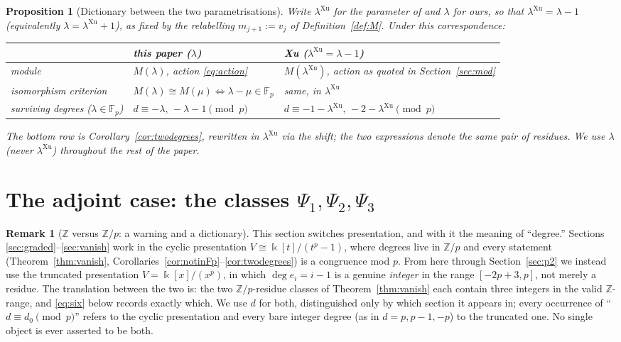 \documentclass[11pt,reqno]{amsart}
\theoremstyle{plain}
\newtheorem{proposition}[theorem]{Proposition}
\theoremstyle{definition}
\newtheorem{remark}[theorem]{Remark}
\newcommand{\kk}{\Bbbk}
\newcommand{\Fp}{\mathbb{F}_p}
\newcommand{\Zp}{\mathbb{Z}/p}
\begin{document}
\begin{proposition}[Dictionary between the two parametrisations]\label{prop:dictionary}
Write $\lambda^{\mathrm{Xu}}$ for the parameter of \cite{Xu1996} and $\lambda$ for ours, so
that $\lambda^{\mathrm{Xu}}=\lambda-1$ (equivalently $\lambda=\lambda^{\mathrm{Xu}}+1$), as
fixed by the relabelling $m_{j+1}:=v_j$ of Definition~\ref{def:M}. Under this correspondence:
\begin{center}
\begin{tabular}{@{}lll@{}}
\toprule
& this paper ($\lambda$) & Xu \cite{Xu1996} ($\lambda^{\mathrm{Xu}}=\lambda-1$)\\
\midrule
module & $M(\lambda)$, action \eqref{eq:action} & $M(\lambda^{\mathrm{Xu}})$, action as quoted
in Section~\ref{sec:mod}\\
isomorphism criterion & $M(\lambda)\cong M(\mu)\iff\lambda-\mu\in\Fp$ & same, in
$\lambda^{\mathrm{Xu}}$\\
surviving degrees ($\lambda\in\Fp$) & $d\equiv-\lambda,\,-\lambda-1\pmod p$ &
$d\equiv-1-\lambda^{\mathrm{Xu}},\,-2-\lambda^{\mathrm{Xu}}\pmod p$\\
\bottomrule
\end{tabular}
\end{center}
The bottom row is Corollary~\ref{cor:twodegrees}, rewritten in $\lambda^{\mathrm{Xu}}$ via the
shift; the two expressions denote the same pair of residues. We use $\lambda$ (never
$\lambda^{\mathrm{Xu}}$) throughout the rest of the paper.
\end{proposition}

\section{The adjoint case: the classes $\Psi_1,\Psi_2,\Psi_3$}\label{sec:adjoint}

\begin{remark}[$\mathbb{Z}$ versus $\Zp$: a warning and a dictionary]\label{rem:ZvsZp}
This section switches presentation, and with it the meaning of ``degree.'' Sections
\ref{sec:graded}--\ref{sec:vanish} work in the cyclic presentation $V\cong\kk[t]/(t^p-1)$,
where degrees live in $\Zp$ and every statement (Theorem~\ref{thm:vanish},
Corollaries~\ref{cor:notinFp}--\ref{cor:twodegrees}) is a congruence mod $p$. From here through
Section~\ref{sec:p2} we instead use the truncated presentation $V=\kk[x]/(x^p)$, in which
$\deg e_i=i-1$ is a genuine \emph{integer} in the range $[-2p+3,p]$, not merely a residue. The
translation between the two is: the two $\Zp$-residue classes of Theorem~\ref{thm:vanish}
each contain three integers in the valid $\mathbb{Z}$-range, and \eqref{eq:six} below
records exactly which. We use $d$ for both, distinguished only by which section it
appears in; every occurrence of ``$d\equiv d_0\pmod p$'' refers to the cyclic presentation and
every bare integer degree (as in $d=p,p-1,-p$) to the truncated one. No single object is ever
asserted to be both.
\end{remark}
\end{document}
